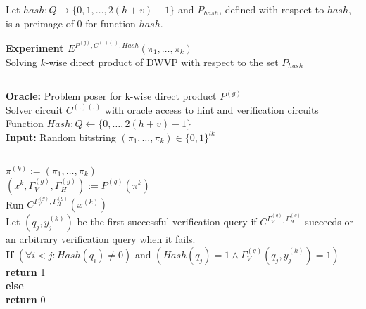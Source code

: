 %
%
Let $hash:Q\rightarrow\{0,1,\dots, 2(h+v)-1\}$ and $P_{hash}$, defined with respect to $hash$, is a preimage of $0$ for function $hash$.

%
%
%
\begin{codeblock}
  \textbf{Experiment $E^{P^{(g)}, C^{(.)(.)}, Hash}(\pi_1, \dots, \pi_k)$} \\
  Solving $k$-wise direct product of DWVP with respect to the set $P_{hash}$
  \medskip

  \hrule

  \medskip
  \textbf{Oracle:} Problem poser for k-wise direct product $P^{(g)}$ \\
  \IndI Solver circuit $C^{(.)(.)}$ with oracle access to hint and verification circuits \\
  \IndI Function $Hash: Q \leftarrow \{0, \dots, 2(h+v) - 1\}$\\
  \textbf{Input:} Random bitstring $(\pi_1, \dots, \pi_k) \in \{0,1\}^{lk}$\\

  \medskip\hrule\medskip

  $\pi^{(k)} := \left(\pi_1, \dots, \pi_k \right)$\\
  $(x^{k}, \Gamma_V^{(g)}, \Gamma_H^{(g)}) := P^{(g)}(\pi^{k})$\\
  Run $C^{\Gamma_V^{(g)}, \Gamma_H^{(g)}} (x^{(k)})$ \\
  \IndI Let $(q_j,y_j^{(k)})$ be the first successful verification query if $C^{\Gamma_V^{(g)}, \Gamma_H^{(g)}}$ succeeds or \\
  \IndI an arbitrary verification query when it fails.\\

  \textbf{If} $(\forall i < j :  Hash(q_i) \neq 0 )$ and $( Hash(q_j) = 1 \land \Gamma_V^{(g)}(q_j, y_j^{(k)}) = 1)$ \\
  \IndI \textbf{return} 1\\
  \textbf{else}\\
  \IndI \textbf{return} 0\\
\end{codeblock}
